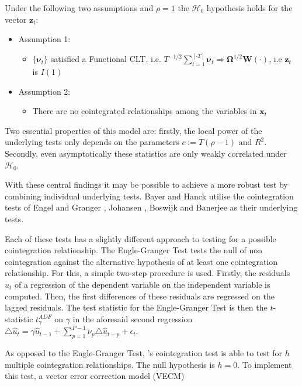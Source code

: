 \documentclass[12pt,a4paper]{article}
\begin{document}
Under the following two assumptions and \(\rho = 1\) the
\(\mathcal{H}_0\) hypothesis holds for the vector \(\pmb{z}_t\):

\begin{itemize}
  \item[] Assumption 1: 
  \begin{itemize}
    \item[] $\{ \pmb{\nu}_t \}$ satisfied a Functional CLT, i.e. $\displaystyle T^{-1/2} \sum_{t = 1}^{[\cdot T]} \pmb{\nu}_t \Rightarrow \pmb{\Omega}^{1/2} \pmb{W}(\cdot)$, i.e $\pmb{z}_t$ is $I(1)$  
  \end{itemize}
  \item[] Assumption 2:
  \begin{itemize}
    \item[] There are no cointegrated relationships among the variables in $\pmb{x}_t$
  \end{itemize}
\end{itemize}

Two essential properties of this model are: firstly, the local power of
the underlying tests only depends on the parameters \(c := T(\rho -1)\)
and \(R^2\). Secondly, even asymptotically these statistics are only
weakly correlated under \(\mathcal{H}_0\). \autocite{gregory_mixed_2004}

With these central findings it may be possible to achieve a more robust
test by combining individual underlying tests. Bayer and Hanck utilise
the cointegration tests of Engel and Granger
\autocite{Englegranger1987}, Johansen \autocite{Johansen1988}, Boswijk
\autocite{Boswijk1994} and Banerjee \autocite{Banerjee1998} as their
underlying tests.

Each of these tests has a slightly different approach to testing for a
possible cointegration relationship. The Engle-Granger Test tests the
null of non cointegration against the alternative hypothesis of at least
one cointegration relationship. For this, a simple two-step procedure is
used. Firstly, the residuals \(\hat{u}_t\) of a regression of the
dependent variable on the independent variable is computed. Then, the
first differences of these residuals are regressed on the lagged
residuals. The test statistic for the Engle-Granger Test is then the
\(t\)-statistic \(t^{ADF}_\gamma\) on \(\gamma\) in the aforesaid second
regression
\(\triangle \hat{u}_t = \gamma \hat{u}_{t-1} + \sum_{p = 1}^{P-1}\nu_p \triangle \hat{u}_{t-p} +\epsilon_t\).
\autocite{Englegranger1987}

As opposed to the Engle-Granger Test, \textcite{Johansen1988}'s
cointegration test is able to test for \(h\) multiple cointegration
relationships. The null hypothesis is \(h = 0\). To implement this test,
a vector error correction model (VECM)
\end{document}
